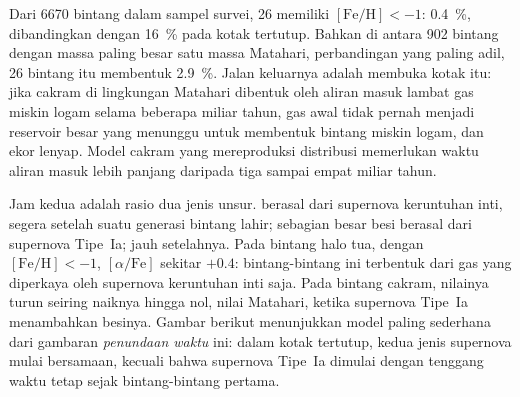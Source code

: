 Dari 6670 bintang dalam sampel survei, 26 memiliki $[\mathrm{Fe/H}] < -1$:
\qty{0.4}{\percent}, dibandingkan dengan \qty{16}{\percent} pada kotak tertutup.
Bahkan di antara 902 bintang dengan massa paling besar satu massa Matahari,
perbandingan yang paling adil, 26 bintang itu membentuk \qty{2.9}{\percent}. Jalan keluarnya adalah membuka
kotak itu: jika cakram di lingkungan Matahari dibentuk oleh aliran masuk lambat
gas miskin logam selama beberapa miliar tahun, gas awal tidak pernah
menjadi reservoir besar yang menunggu untuk membentuk bintang miskin logam, dan ekor
lenyap. Model cakram yang mereproduksi distribusi memerlukan waktu aliran masuk
lebih panjang daripada tiga sampai empat miliar tahun.

Jam kedua adalah rasio dua jenis unsur. 
berasal dari supernova keruntuhan inti, segera setelah suatu generasi
bintang lahir; sebagian besar besi berasal dari supernova Tipe~Ia;
jauh setelahnya. Pada bintang halo tua, dengan $[\mathrm{Fe/H}] < -1$,
$[\alpha/\mathrm{Fe}]$ sekitar $+0.4$: bintang-bintang ini terbentuk dari gas
yang diperkaya oleh supernova keruntuhan inti saja. Pada bintang cakram, nilainya turun
seiring naiknya  hingga nol, nilai Matahari, ketika supernova Tipe~Ia
menambahkan besinya. Gambar berikut menunjukkan model paling sederhana
dari gambaran \emph{penundaan waktu} ini: dalam kotak tertutup, kedua jenis
supernova mulai bersamaan, kecuali bahwa supernova Tipe~Ia dimulai dengan tenggang waktu tetap
sejak bintang-bintang pertama.

